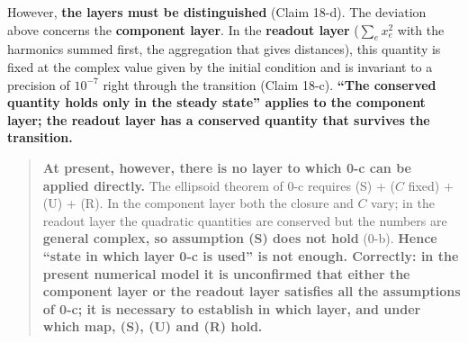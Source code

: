 \documentclass[
  10pt,
]{article}
\begin{document}
However, \textbf{the layers must be distinguished} (Claim 18-d). The
deviation above concerns the \textbf{component layer}. In the
\textbf{readout layer} (\(\sum_e x_e^2\) with the harmonics summed
first, the aggregation that gives distances), this quantity is fixed at
the complex value given by the initial condition and is invariant to a
precision of \(10^{-7}\) right through the transition (Claim 18-c).
\textbf{``The conserved quantity holds only in the steady state''
applies to the component layer; the readout layer has a conserved
quantity that survives the transition.}

\begin{quote}
\textbf{At present, however, there is no layer to which 0-c can be
applied directly.} The ellipsoid theorem of 0-c requires (S) + (\(C\)
fixed) + (U) + (R). In the component layer both the closure and \(C\)
vary; in the readout layer the quadratic quantities are conserved but
the numbers are \textbf{general complex, so assumption (S) does not
hold} (0-b). \textbf{Hence ``state in which layer 0-c is used'' is not
enough. Correctly: in the present numerical model it is unconfirmed that
either the component layer or the readout layer satisfies all the
assumptions of 0-c; it is necessary to establish in which layer, and
under which map, (S), (U) and (R) hold.}
\end{quote}
\end{document}
